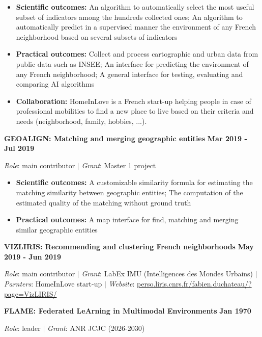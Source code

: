 \documentclass{article}
\begin{document}
\begin{itemize}
\item \textbf{Scientific outcomes:} An algorithm to automatically select the most useful subset of indicators among the hundreds collected ones; An algorithm to automatically predict in a supervised manner the environment of any French neighborhood based on several subsets of indicators
\item \textbf{Practical outcomes:} Collect and process cartographic and urban data from public data such as INSEE; An interface for predicting the environment of any French neighborhood; A general interface for testing, evaluating and comparing AI algorithms
\item \textbf{Collaboration:} HomeInLove is a French start-up helping people in case of professional mobilities to find a new place to live based on their criteria and needs (neighborhood, family, hobbies, ...).
\end{itemize}
\vspace{1em}\noindent\textbf{GEOALIGN: Matching and merging geographic entities} \hfill \textbf{Mar 2019 - Jul 2019}


\noindent\textit{Role}: main contributor $|$ \textit{Grant}: Master 1 project

\begin{itemize}
\item \textbf{Scientific outcomes:} A customizable similarity formula for estimating the matching similarity between geographic entities; The computation of the estimated quality of the matching without ground truth
\item \textbf{Practical outcomes:} A map interface for find, matching and merging similar geographic entities
\end{itemize}
\vspace{1em}\noindent\textbf{VIZLIRIS: Recommending and clustering French neighborhoods} \hfill \textbf{May 2019 - Jun 2019}


\noindent\textit{Role}: main contributor $|$ \textit{Grant}: LabEx IMU (Intelligences des Mondes Urbains) $|$ \textit{Parnters}: HomeInLove start-up $|$ \textit{Website}: \href{https://perso.liris.cnrs.fr/fabien.duchateau/?page=VizLIRIS/}{perso.liris.cnrs.fr/fabien.duchateau/?page=VizLIRIS/}

\vspace{1em}\noindent\textbf{FLAME: Federated LeArning in Multimodal Environments} \hfill \textbf{Jan 1970}


\noindent\textit{Role}: leader $|$ \textit{Grant}: ANR JCJC (2026-2030)
\end{document}
